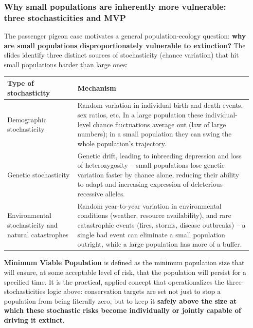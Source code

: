 \documentclass[11pt,a4paper]{article}
\begin{document}
\subsubsection{Why small populations are inherently more vulnerable: three stochasticities and MVP}
The passenger pigeon case motivates a general population-ecology question: \textbf{why are small populations disproportionately vulnerable to extinction?} The slides identify three distinct sources of stochasticity (chance variation) that hit small populations harder than large ones:

\begin{center}
\begin{tabularx}{\textwidth}{@{}l X@{}}
\toprule
\textbf{Type of stochasticity} & \textbf{Mechanism} \\
\midrule
Demographic stochasticity & Random variation in individual birth and death events, sex ratios, etc. In a large population these individual-level chance fluctuations average out (law of large numbers); in a small population they can swing the whole population's trajectory. \\
Genetic stochasticity & Genetic drift, leading to inbreeding depression and loss of heterozygosity -- small populations lose genetic variation faster by chance alone, reducing their ability to adapt and increasing expression of deleterious recessive alleles. \\
Environmental stochasticity and natural catastrophes & Random year-to-year variation in environmental conditions (weather, resource availability), and rare catastrophic events (fires, storms, disease outbreaks) -- a single bad event can eliminate a small population outright, while a large population has more of a buffer. \\
\bottomrule
\end{tabularx}
\end{center}

\begin{keybox}[title={Minimum Viable Population (MVP)}]
\textbf{Minimum Viable Population} is defined as the minimum population size that will ensure, at some acceptable level of risk, that the population will persist for a specified time. It is the practical, applied concept that operationalizes the three-stochasticities logic above: conservation targets are set not just to stop a population from being literally zero, but to keep it \textbf{safely above the size at which these stochastic risks become individually or jointly capable of driving it extinct}.
\end{keybox}
\end{document}
